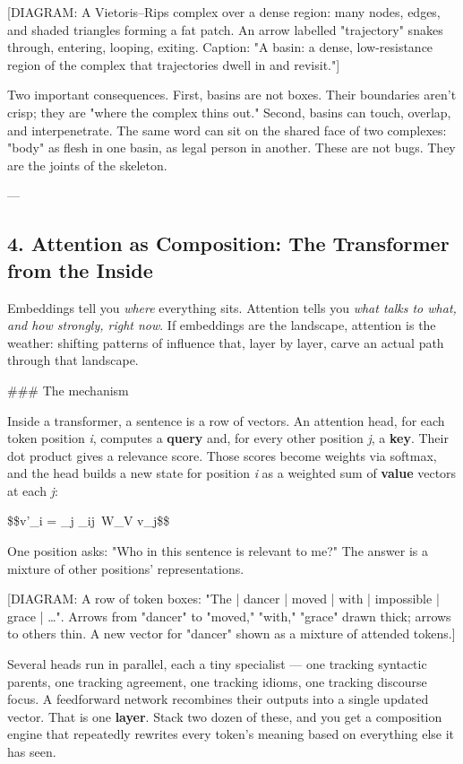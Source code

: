 \documentclass[12pt,a4paper]{article}
\begin{document}
[DIAGRAM: A Vietoris–Rips complex over a dense region: many nodes, edges, and shaded triangles forming a fat patch. An arrow labelled "trajectory" snakes through, entering, looping, exiting. Caption: "A basin: a dense, low-resistance region of the complex that trajectories dwell in and revisit."]

Two important consequences. First, basins are not boxes. Their boundaries aren't crisp; they are "where the complex thins out." Second, basins can touch, overlap, and interpenetrate. The same word can sit on the shared face of two complexes: "body" as flesh in one basin, as legal person in another. These are not bugs. They are the joints of the skeleton.

---

\subsection{4. Attention as Composition: The Transformer from the Inside}

Embeddings tell you \textit{where} everything sits. Attention tells you \textit{what talks to what, and how strongly, right now}. If embeddings are the landscape, attention is the weather: shifting patterns of influence that, layer by layer, carve an actual path through that landscape.

\#\#\# The mechanism

Inside a transformer, a sentence is a row of vectors. An attention head, for each token position \textit{i}, computes a \textbf{query} and, for every other position \textit{j}, a \textbf{key}. Their dot product gives a relevance score. Those scores become weights via softmax, and the head builds a new state for position \textit{i} as a weighted sum of \textbf{value} vectors at each \textit{j}:

\$\$v'\_i = \sum\_j \alpha\_{ij}\, W\_V v\_j\$\$

One position asks: "Who in this sentence is relevant to me?" The answer is a mixture of other positions' representations.

[DIAGRAM: A row of token boxes: "The | dancer | moved | with | impossible | grace | …". Arrows from "dancer" to "moved," "with," "grace" drawn thick; arrows to others thin. A new vector for "dancer" shown as a mixture of attended tokens.]

Several heads run in parallel, each a tiny specialist --- one tracking syntactic parents, one tracking agreement, one tracking idioms, one tracking discourse focus. A feedforward network recombines their outputs into a single updated vector. That is one \textbf{layer}. Stack two dozen of these, and you get a composition engine that repeatedly rewrites every token's meaning based on everything else it has seen.
\end{document}
